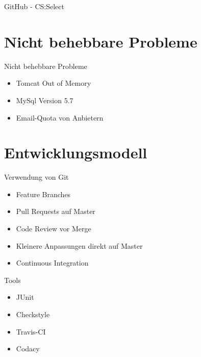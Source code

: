 \documentclass[xcolor=dvipsnames]{beamer}
\begin{document}
    \begin{frame}{GitHub - CS:Select}
        \begin{itemize}
            \vspace{10pt}
        \end{itemize}
    \end{frame}

    \section{Nicht behebbare Probleme}
    \begin{frame}{Nicht behebbare Probleme}
        \begin{itemize}
            \item Tomcat Out of Memory
            \item MySql Version 5.7
            \item Email-Quota von Anbietern
        \end{itemize}
    \end{frame}

    \section{Entwicklungsmodell}
    \begin{frame}{Verwendung von Git}
        \begin{itemize}
            \item Feature Branches
            \item Pull Requests auf Master
            \item Code Review vor Merge
            \item Kleinere Anpassungen direkt auf Master
            \item Continuous Integration
        \end{itemize}
    \end{frame}

    \begin{frame}{Tools}
        \begin{itemize}
            \item JUnit
            \item Checkstyle
            \item Travis-CI
            \item Codacy
        \end{itemize}
    \end{frame}
\end{document}
